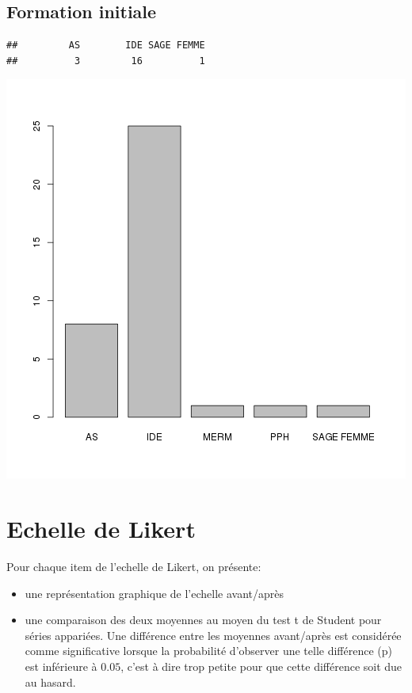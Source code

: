 \documentclass[12pt,english,french]{article}\usepackage{graphicx, color}
\makeatletter
\def\maxwidth{ %
  \ifdim\Gin@nat@width>\linewidth
    \linewidth
  \else
    \Gin@nat@width
  \fi
}
\newenvironment{kframe}{%
 \def\at@end@of@kframe{}%
 \ifinner\ifhmode%
  \def\at@end@of@kframe{\end{minipage}}%
  \begin{minipage}{\columnwidth}%
 \fi\fi%
 \def\FrameCommand##1{\hskip\@totalleftmargin \hskip-\fboxsep
 \colorbox{shadecolor}{##1}\hskip-\fboxsep
     \hskip-\linewidth \hskip-\@totalleftmargin \hskip\columnwidth}%
 \MakeFramed {\advance\hsize-\width
   \@totalleftmargin\z@ \linewidth\hsize
   \@setminipage}}%
 {\par\unskip\endMakeFramed%
 \at@end@of@kframe}
\newenvironment{knitrout}{}{} %
\makeatother
\begin{document}
\subsection{Formation initiale}
\begin{knitrout}
\color{fgcolor}\begin{kframe}
\begin{verbatim}
##         AS        IDE SAGE FEMME 
##          3         16          1
\end{verbatim}
\end{kframe}
\includegraphics[width=\maxwidth]{../figure/c5.png} 

\end{knitrout}



\section{Echelle de Likert}

Pour chaque item de l'echelle de Likert, on présente:
\begin{itemize}
  \item une représentation graphique de l'echelle avant/après
  \item une comparaison des deux moyennes au moyen du test t de Student pour séries appariées. Une différence entre les moyennes avant/après est considérée comme significative lorsque la probabilité d'observer une telle différence (p) est inférieure à $0.05$, c'est à dire trop petite pour que cette différence soit due au hasard.
\end{itemize}
\end{document}
